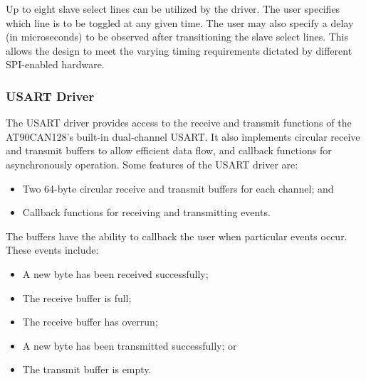 Up to eight slave select lines can be utilized by the driver. The user specifies which line is to be toggled at any given time. The user may also specify a delay (in microseconds) to be observed after transitioning the slave select lines. This allows the design to meet the varying timing requirements dictated by different SPI-enabled hardware.

\subsubsection{USART Driver}

The USART driver provides access to the receive and transmit functions of the AT90CAN128's built-in dual-channel USART. It also implements circular receive and transmit buffers to allow efficient data flow, and callback functions for asynchronously operation.
Some features of the USART driver are:

\begin{itemize}
	\item Two 64-byte circular receive and transmit buffers for each channel; and
	\item Callback functions for receiving and transmitting events.
\end{itemize}

The buffers have the ability to callback the user when particular events occur. These events include:

\begin{itemize}
\item A new byte has been received successfully; 
\item The receive buffer is full;
\item The receive buffer has overrun;
\item A new byte has been transmitted successfully; or
\item The transmit buffer is empty.
\end{itemize}
